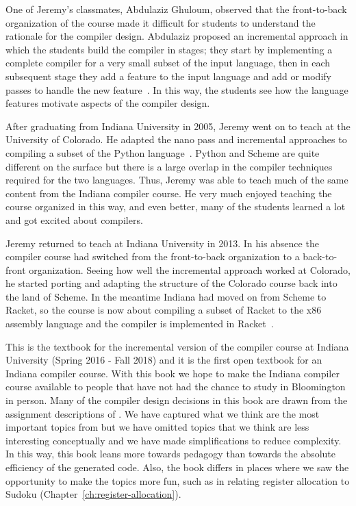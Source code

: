\documentclass[11pt]{book}
\begin{document}
One of Jeremy's classmates, Abdulaziz Ghuloum, observed that the
front-to-back organization of the course made it difficult for
students to understand the rationale for the compiler
design. Abdulaziz proposed an incremental approach in which the
students build the compiler in stages; they start by implementing a
complete compiler for a very small subset of the input language, then
in each subsequent stage they add a feature to the input language and
add or modify passes to handle the new feature~\citep{Ghuloum:2006bh}.
In this way, the students see how the language features motivate
aspects of the compiler design.

After graduating from Indiana University in 2005, Jeremy went on to
teach at the University of Colorado. He adapted the nano pass and
incremental approaches to compiling a subset of the Python
language~\citep{Siek:2012ab}.  Python and Scheme are quite different
on the surface but there is a large overlap in the compiler techniques
required for the two languages. Thus, Jeremy was able to teach much of
the same content from the Indiana compiler course. He very much
enjoyed teaching the course organized in this way, and even better,
many of the students learned a lot and got excited about compilers.

Jeremy returned to teach at Indiana University in 2013.  In his
absence the compiler course had switched from the front-to-back
organization to a back-to-front organization. Seeing how well the
incremental approach worked at Colorado, he started porting and
adapting the structure of the Colorado course back into the land of
Scheme. In the meantime Indiana had moved on from Scheme to Racket, so
the course is now about compiling a subset of Racket to the x86
assembly language and the compiler is implemented in
Racket~\citep{plt-tr}.

This is the textbook for the incremental version of the compiler
course at Indiana University (Spring 2016 - Fall 2018) and it is the
first open textbook for an Indiana compiler course.  With this book we
hope to make the Indiana compiler course available to people that have
not had the chance to study in Bloomington in person.  Many of the
compiler design decisions in this book are drawn from the assignment
descriptions of \cite{Dybvig:2010aa}. We have captured what we think are
the most important topics from \cite{Dybvig:2010aa} but we have omitted
topics that we think are less interesting conceptually and we have made
simplifications to reduce complexity.  In this way, this book leans
more towards pedagogy than towards the absolute efficiency of the
generated code. Also, the book differs in places where we saw the
opportunity to make the topics more fun, such as in relating register
allocation to Sudoku (Chapter~\ref{ch:register-allocation}).
\end{document}
